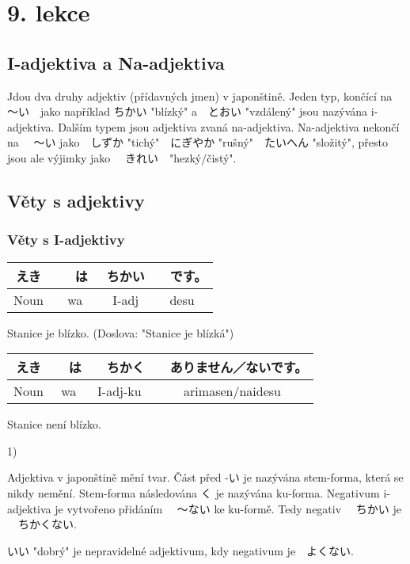\section{9. lekce}
\label{sec:lekce_9}

\subsection{I-adjektiva a Na-adjektiva}

Jdou dva druhy adjektiv (přídavných jmen) v japonštině. Jeden typ, končící na 〜い　jako například ちかい "blízký" a　とおい "vzdálený" jsou nazývána i-adjektiva. Dalším typem jsou adjektiva zvaná na-adjektiva. Na-adjektiva nekončí na 　〜い jako　しずか "tichý"　にぎやか "rušný"　たいへん "složitý", přesto jsou ale výjimky jako 　きれい　"hezký/čistý".

\subsection{Věty s adjektivy}
\subsubsection{Věty s I-adjektivy}
\begin{center}
\begin{tabular}{|c|c|c|c|}
\hline
えき&　は　&ちかい&　です。\\
\hline
Noun&wa&I-adj&desu\\
\hline
\end{tabular}
\end{center}
Stanice je blízko. (Doslova: "Stanice je blízká")

\vspace{1 cm}
\begin{center}
\begin{tabular}{|c|c|c|c|}
\hline
えき&　は&　ちかく&　ありません／ないです。\\
\hline
Noun&wa&I-adj-ku&arimasen/naidesu\\
\hline
\end{tabular}
\end{center}
Stanice není blízko.

1)

Adjektiva v japonštině mění tvar. Část před -い je nazývána stem-forma, která se nikdy nemění. Stem-forma následována く je nazývána ku-forma. Negativum i-adjektiva je vytvořeno přidáním 　〜ない ke ku-formě. Tedy negativ 　ちかい je 　ちかくない.

いい "dobrý" je nepravidelné adjektivum, kdy negativum je　よくない.


